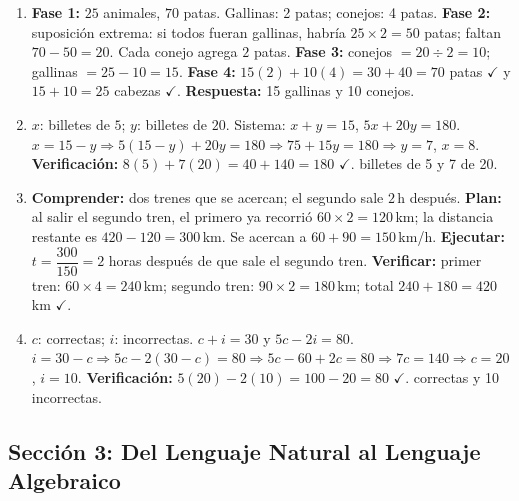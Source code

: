 \documentclass[12pt, letterpaper]{article}
\begin{document}
  \begin{enumerate}[leftmargin=*, label=\textbf{\arabic*.}]
    \item \textbf{Fase 1:} $25$ animales, $70$ patas. Gallinas: 2 patas; conejos: 4 patas.
          \textbf{Fase 2:} suposición extrema: si todos fueran gallinas, habría $25 \times 2 = 50$ patas; faltan $70 - 50 = 20$. Cada conejo agrega $2$ patas.
          \textbf{Fase 3:} conejos $= 20 \div 2 = 10$; gallinas $= 25 - 10 = 15$.
          \textbf{Fase 4:} $15(2) + 10(4) = 30 + 40 = 70$ patas $\checkmark$ y $15 + 10 = 25$ cabezas $\checkmark$.
          \textbf{Respuesta:} 15 gallinas y 10 conejos.

    \item $x$: billetes de $5$; $y$: billetes de $20$. Sistema: $x + y = 15$, $5x + 20y = 180$.
          $x = 15 - y \Rightarrow 5(15 - y) + 20y = 180 \Rightarrow 75 + 15y = 180 \Rightarrow y = 7$, $x = 8$.
          \textbf{Verificación:} $8(5) + 7(20) = 40 + 140 = 180$ $\checkmark$.  billetes de 5 y 7 de 20.

    \item \textbf{Comprender:} dos trenes que se acercan; el segundo sale $2$\,h después.
          \textbf{Plan:} al salir el segundo tren, el primero ya recorrió $60 \times 2 = 120$\,km; la distancia restante es $420 - 120 = 300$\,km. Se acercan a $60 + 90 = 150$\,km/h.
          \textbf{Ejecutar:} $t = \dfrac{300}{150} = 2$ horas después de que sale el segundo tren.
          \textbf{Verificar:} primer tren: $60 \times 4 = 240$\,km; segundo tren: $90 \times 2 = 180$\,km; total $240 + 180 = 420$\,km $\checkmark$.

    \item $c$: correctas; $i$: incorrectas. $c + i = 30$ y $5c - 2i = 80$.
          $i = 30 - c \Rightarrow 5c - 2(30 - c) = 80 \Rightarrow 5c - 60 + 2c = 80 \Rightarrow 7c = 140 \Rightarrow c = 20$, $i = 10$.
          \textbf{Verificación:} $5(20) - 2(10) = 100 - 20 = 80$ $\checkmark$.  correctas y 10 incorrectas.
  \end{enumerate}

  \newpage

  \subsection*{Sección 3: Del Lenguaje Natural al Lenguaje Algebraico}
\end{document}
